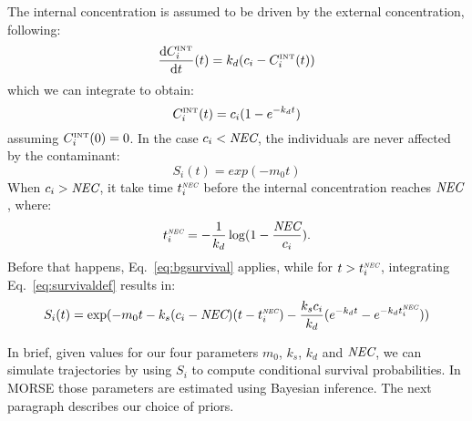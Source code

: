 \documentclass{article}
\begin{document}
\noindent The internal concentration is assumed to be driven by the external
concentration, following:
$$
\frac{\mathop{\mathrm{d}\!} C^{\mbox{\tiny INT}}_i}{\mathop{\mathrm{d}\!} t}(t) = k_d (c_i - C^{\mbox{\tiny INT}}_i(t))
$$
which we can integrate to obtain:
\begin{equation}
\label{eq:cint}
C^{\mbox{\tiny INT}}_i(t) = c_i(1 - e^{-k_d t})
\end{equation}
assuming $C^{\mbox{\tiny INT}}_i(0) = 0$. In the case $c_i < \mbox{\it NEC}$, the individuals
are never affected by the contaminant:
\begin{equation}
  \label{eq:bgsurvival}
  S_i(t) = exp( - m_0 t )
\end{equation}
When $c_i > \mbox{\it NEC}$, it take time $t^{\tiny \mbox{\it NEC}}_i$ before the internal
concentration reaches $\mbox{\it NEC}$, where:
$$
t^{\tiny \mbox{\it NEC}}_i = - \frac{1}{k_d} \log (1 - \frac{\mbox{\it NEC}}{c_i}).
$$
Before that happens, Eq.~\ref{eq:bgsurvival} applies, while for $t >
t^{\tiny \mbox{\it NEC}}_i$, integrating Eq.~\ref{eq:survivaldef} results in:
$$
S_i(t) = \exp(- m_0 t - k_s(c_i - \mbox{\it NEC})(t - t^{\tiny \mbox{\it NEC}}_i) - \frac{k_s c_i}{k_d}(e^{- k_d t} - e^{-k_d t^{\tiny \mbox{\it NEC}}_i}))
$$

In brief, given values for our four parameters $m_0$, $k_s$, $k_d$ and
$\mbox{\it NEC}$, we can simulate trajectories by using $S_i$ to compute
conditional survival probabilities. In MORSE those parameters are
estimated using Bayesian inference. The next paragraph describes our
choice of priors.
\end{document}
